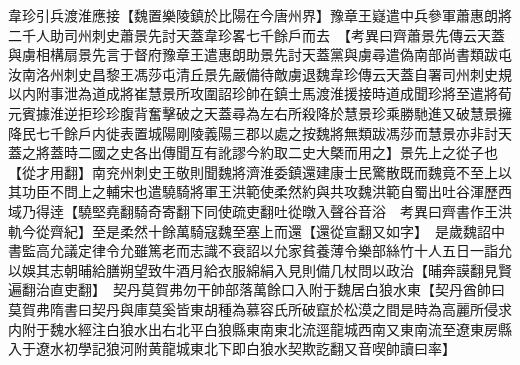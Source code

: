 韋珍引兵渡淮應接【魏置樂陵鎮於比陽在今唐州界】豫章王嶷遣中兵參軍蕭惠朗將二千人助司州刺史蕭景先討天蓋韋珍畧七千餘戶而去　【考異曰齊蕭景先傳云天蓋與虜相構扇景先言于督府豫章王遣惠朗助景先討天蓋黨與虜尋遣偽南部尚書類跋屯汝南洛州刺史昌黎王馮莎屯清丘景先嚴備待敵虜退魏韋珍傳云天蓋自署司州刺史規以内附事泄為道成將崔慧景所攻圍詔珍帥在鎮士馬渡淮援接時道成聞珍將至遣將荀元賓據淮逆拒珍珍腹背奮擊破之天蓋尋為左右所殺降於慧景珍乘勝馳進又破慧景擁降民七千餘戶内徙表置城陽剛陵義陽三郡以處之按魏將無類跋馮莎而慧景亦非討天蓋之將蓋時二國之史各出傳聞互有訛謬今約取二史大槩而用之】景先上之從子也【從才用翻】南兖州刺史王敬則聞魏將濟淮委鎮還建康士民驚散既而魏竟不至上以其功臣不問上之輔宋也遣驍騎將軍王洪範使柔然約與共攻魏洪範自蜀出吐谷渾歷西域乃得逹【驍堅堯翻騎奇寄翻下同使疏吏翻吐從暾入聲谷音浴　考異曰齊書作王洪軌今從齊紀】至是柔然十餘萬騎寇魏至塞上而還【還從宣翻又如字】　是歲魏詔中書監高允議定律令允雖篤老而志識不衰詔以允家貧養薄令樂部絲竹十人五日一詣允以娛其志朝晡給膳朔望致牛酒月給衣服綿絹入見則備几杖問以政治【晡奔謨翻見賢遍翻治直吏翻】　契丹莫賀弗勿干帥部落萬餘口入附于魏居白狼水東【契丹酋帥曰莫賀弗隋書曰契丹與庫莫奚皆東胡種為慕容氏所破竄於松漠之間是時為高麗所侵求内附于魏水經注白狼水出右北平白狼縣東南東北流逕龍城西南又東南流至遼東房縣入于遼水初學記狼河附黄龍城東北下即白狼水契欺訖翻又音喫帥讀曰率】

